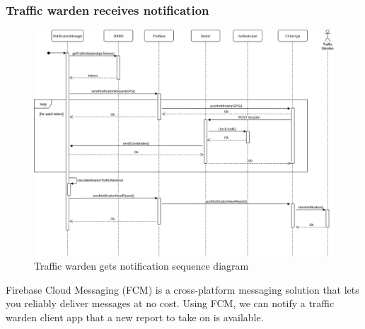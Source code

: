 \documentclass{article}
\begin{document}
\subsubsection{Traffic warden receives notification}
\label{sec:notification}
\begin{figure}[h!]
\centering
	\includegraphics[width=1.0\textwidth]{images/notification-sequence.png}
	\caption{Traffic warden gets notification sequence diagram}
	\label{fig:notifaction-sequence}
\end{figure}
Firebase Cloud Messaging (FCM) is a cross-platform messaging solution that lets you reliably deliver messages at no cost.
Using FCM, we can notify a traffic warden client app that a new report to take on is available.

\newpage
\end{document}
